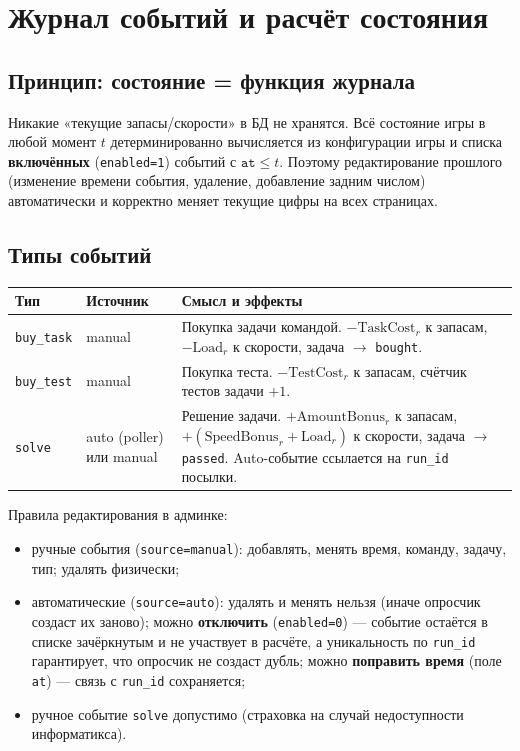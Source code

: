 \documentclass[12pt,a4paper]{article}
\newcommand{\field}[1]{\texttt{#1}}
\begin{document}
\section{Журнал событий и расчёт состояния}
\label{sec:events}

\subsection{Принцип: состояние = функция журнала}

Никакие «текущие запасы/скорости» в БД не хранятся. Всё состояние игры в
любой момент $t$ детерминированно вычисляется из конфигурации игры и
списка \textbf{включённых} (\field{enabled=1}) событий с $\field{at} \le t$.
Поэтому редактирование прошлого (изменение времени события, удаление,
добавление задним числом) автоматически и корректно меняет текущие цифры
на всех страницах.

\subsection{Типы событий}

\begin{longtable}{@{}p{2.6cm}p{2.4cm}p{10.5cm}@{}}
\toprule
\textbf{Тип} & \textbf{Источник} & \textbf{Смысл и эффекты} \\
\midrule
\field{buy\_task} & manual & Покупка задачи командой. $-\mathrm{TaskCost}_r$ к запасам, $-\mathrm{Load}_r$ к скорости, задача $\to$ \field{bought}. \\
\field{buy\_test} & manual & Покупка теста. $-\mathrm{TestCost}_r$ к запасам, счётчик тестов задачи $+1$. \\
\field{solve} & auto (poller) или manual & Решение задачи. $+\mathrm{AmountBonus}_r$ к запасам, $+(\mathrm{SpeedBonus}_r + \mathrm{Load}_r)$ к скорости, задача $\to$ \field{passed}. Auto-событие ссылается на \field{run\_id} посылки. \\
\bottomrule
\end{longtable}

Правила редактирования в админке:

\begin{itemize}[nosep]
  \item ручные события (\field{source=manual}): добавлять, менять время,
        команду, задачу, тип; удалять физически;
  \item автоматические (\field{source=auto}): удалять и менять
        нельзя (иначе опросчик создаст их заново); можно
        \textbf{отключить} (\field{enabled=0}) --- событие остаётся в списке
        зачёркнутым и не участвует в расчёте, а уникальность по
        \field{run\_id} гарантирует, что опросчик не создаст дубль; можно
        \textbf{поправить время} (поле \field{at}) --- связь с
        \field{run\_id} сохраняется;
  \item ручное событие \field{solve} допустимо (страховка на случай
        недоступности информатикса).
\end{itemize}
\end{document}
